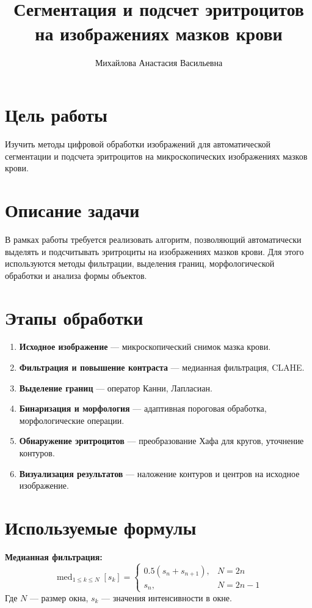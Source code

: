 \documentclass[12pt,a4paper]{article}
\title{\\Сегментация и подсчет эритроцитов на изображениях мазков крови}
\author{Михайлова Анастасия Васильевна}
\begin{document}
\maketitle

\section*{Цель работы}

Изучить методы цифровой обработки изображений для автоматической сегментации и подсчета эритроцитов на микроскопических изображениях мазков крови.

\section*{Описание задачи}

В рамках работы требуется реализовать алгоритм, позволяющий автоматически выделять и подсчитывать эритроциты на изображениях мазков крови. Для этого используются методы фильтрации, выделения границ, морфологической обработки и анализа формы объектов.

\section*{Этапы обработки}

\begin{enumerate}
    \item \textbf{Исходное изображение} --- микроскопический снимок мазка крови.
    \item \textbf{Фильтрация и повышение контраста} --- медианная фильтрация, CLAHE.
    \item \textbf{Выделение границ} --- оператор Канни, Лапласиан.
    \item \textbf{Бинаризация и морфология} --- адаптивная пороговая обработка, морфологические операции.
    \item \textbf{Обнаружение эритроцитов} --- преобразование Хафа для кругов, уточнение контуров.
    \item \textbf{Визуализация результатов} --- наложение контуров и центров на исходное изображение.
\end{enumerate}

\section*{Используемые формулы}

\textbf{Медианная фильтрация:}
\begin{equation}
\operatorname{med}_{1 \leq k \leq N}\left[s_{k}\right]=
\begin{cases}
0.5(s_{n}+s_{n+1}), & N=2n \\
s_{n}, & N=2n-1
\end{cases}
\end{equation}
\noindent
Где $N$ --- размер окна, $s_k$ --- значения интенсивности в окне.
\end{document}

